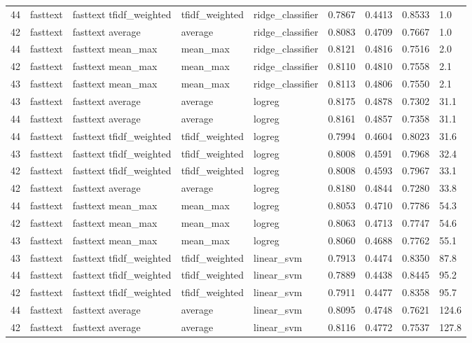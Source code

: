\begin{table}[htbp]
\begin{tabular}{lllllllll}
44 & fasttext & fasttext tfidf\_weighted & tfidf\_weighted & ridge\_classifier & 0.7867 & 0.4413 & 0.8533 & 1.0 \\
42 & fasttext & fasttext average & average & ridge\_classifier & 0.8083 & 0.4709 & 0.7667 & 1.0 \\
44 & fasttext & fasttext mean\_max & mean\_max & ridge\_classifier & 0.8121 & 0.4816 & 0.7516 & 2.0 \\
42 & fasttext & fasttext mean\_max & mean\_max & ridge\_classifier & 0.8110 & 0.4810 & 0.7558 & 2.1 \\
43 & fasttext & fasttext mean\_max & mean\_max & ridge\_classifier & 0.8113 & 0.4806 & 0.7550 & 2.1 \\
43 & fasttext & fasttext average & average & logreg & 0.8175 & 0.4878 & 0.7302 & 31.1 \\
44 & fasttext & fasttext average & average & logreg & 0.8161 & 0.4857 & 0.7358 & 31.1 \\
44 & fasttext & fasttext tfidf\_weighted & tfidf\_weighted & logreg & 0.7994 & 0.4604 & 0.8023 & 31.6 \\
43 & fasttext & fasttext tfidf\_weighted & tfidf\_weighted & logreg & 0.8008 & 0.4591 & 0.7968 & 32.4 \\
42 & fasttext & fasttext tfidf\_weighted & tfidf\_weighted & logreg & 0.8008 & 0.4593 & 0.7967 & 33.1 \\
42 & fasttext & fasttext average & average & logreg & 0.8180 & 0.4844 & 0.7280 & 33.8 \\
44 & fasttext & fasttext mean\_max & mean\_max & logreg & 0.8053 & 0.4710 & 0.7786 & 54.3 \\
42 & fasttext & fasttext mean\_max & mean\_max & logreg & 0.8063 & 0.4713 & 0.7747 & 54.6 \\
43 & fasttext & fasttext mean\_max & mean\_max & logreg & 0.8060 & 0.4688 & 0.7762 & 55.1 \\
43 & fasttext & fasttext tfidf\_weighted & tfidf\_weighted & linear\_svm & 0.7913 & 0.4474 & 0.8350 & 87.8 \\
44 & fasttext & fasttext tfidf\_weighted & tfidf\_weighted & linear\_svm & 0.7889 & 0.4438 & 0.8445 & 95.2 \\
42 & fasttext & fasttext tfidf\_weighted & tfidf\_weighted & linear\_svm & 0.7911 & 0.4477 & 0.8358 & 95.7 \\
44 & fasttext & fasttext average & average & linear\_svm & 0.8095 & 0.4748 & 0.7621 & 124.6 \\
42 & fasttext & fasttext average & average & linear\_svm & 0.8116 & 0.4772 & 0.7537 & 127.8 \\

\end{tabular}
\end{table}
